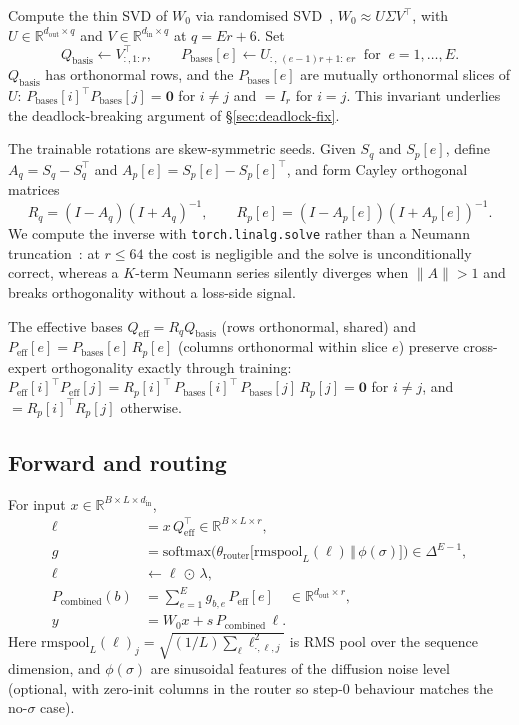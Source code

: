 \documentclass[10pt]{article}
\newcommand{\Rb}{\mathbb{R}}
\newcommand{\T}{^{\!\top}}
\newcommand{\Peff}{P_{\mathrm{eff}}}
\newcommand{\Qeff}{Q_{\mathrm{eff}}}
\newcommand{\Qbasis}{Q_{\mathrm{basis}}}
\newcommand{\Pbases}{P_{\mathrm{bases}}}
\begin{document}
Compute the thin SVD of $W_0$ via randomised
SVD~\cite{halko2011randomized}, $W_0 \approx U\Sigma V\T$, with $U
\in \Rb^{d_{\mathrm{out}}\times q}$ and $V \in
\Rb^{d_{\mathrm{in}}\times q}$ at $q = Er + 6$. Set
\[
\Qbasis \leftarrow V_{:,1:r}\T,
\qquad
\Pbases[e] \leftarrow U_{:,\,(e-1)r+1:\,er}
\;\;\text{for}\;\; e=1,\dots,E.
\]
$\Qbasis$ has orthonormal rows, and the $\Pbases[e]$ are mutually
orthonormal slices of $U$: $\Pbases[i]\T \Pbases[j] = \mathbf{0}$
for $i \neq j$ and $= I_r$ for $i=j$. This invariant underlies the
deadlock-breaking argument of \S\ref{sec:deadlock-fix}.

The trainable rotations are skew-symmetric seeds. Given $S_q$ and
$S_p[e]$, define $A_q = S_q - S_q\T$ and $A_p[e] = S_p[e] - S_p[e]\T$,
and form Cayley orthogonal matrices
\[
R_q = (I - A_q)(I + A_q)^{-1},
\qquad
R_p[e] = (I - A_p[e])(I + A_p[e])^{-1}.
\]
We compute the inverse with \texttt{torch.linalg.solve} rather than a
Neumann truncation~\cite{wu2026psoft}: at $r \leq 64$ the cost is
negligible and the solve is unconditionally correct, whereas a
$K$-term Neumann series silently diverges when $\lVert A\rVert > 1$
and breaks orthogonality without a loss-side signal.

The effective bases $\Qeff = R_q \Qbasis$ (rows orthonormal, shared)
and $\Peff[e] = \Pbases[e]\, R_p[e]$ (columns orthonormal within
slice $e$) preserve cross-expert orthogonality exactly through
training: $\Peff[i]\T \Peff[j] = R_p[i]\T\, \Pbases[i]\T\,
\Pbases[j]\, R_p[j] = \mathbf{0}$ for $i \neq j$, and $= R_p[i]\T
R_p[j]$ otherwise.

\subsection{Forward and routing}

For input $x \in \Rb^{B\times L\times d_{\mathrm{in}}}$,
\begin{align*}
\ell &= x\,\Qeff\T \in \Rb^{B\times L\times r}, \\
g    &= \mathrm{softmax}\bigl(\theta_{\mathrm{router}}\bigl[\mathrm{rmspool}_L(\ell)\,\big\Vert\,\phi(\sigma)\bigr]\bigr) \in \Delta^{E-1}, \\
\ell &\leftarrow \ell\,\odot\,\lambda, \\
P_{\mathrm{combined}}(b) &= \sum_{e=1}^{E} g_{b,e}\,\Peff[e] \quad\in\Rb^{d_{\mathrm{out}}\times r}, \\
y    &= W_0 x + s\,P_{\mathrm{combined}}\,\ell.
\end{align*}
Here $\mathrm{rmspool}_L(\ell)_j = \sqrt{(1/L)\sum_\ell
\ell_{\cdot,\ell,j}^2}$ is RMS pool over the sequence dimension, and
$\phi(\sigma)$ are sinusoidal features of the diffusion noise level
(optional, with zero-init columns in the router so step-$0$ behaviour
matches the no-$\sigma$ case).
\end{document}

